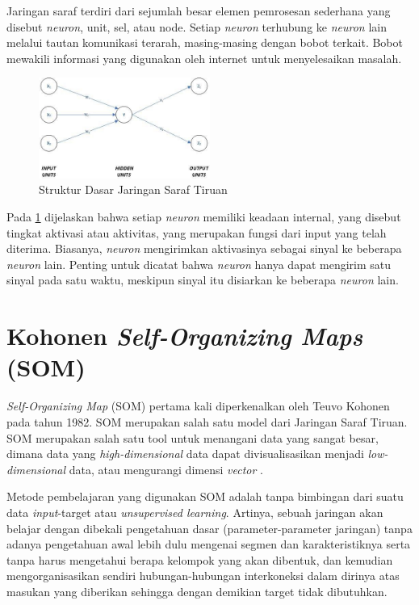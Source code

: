 Jaringan saraf terdiri dari sejumlah besar elemen pemrosesan sederhana yang disebut \textit{neuron}, unit, sel, atau node. Setiap \textit{neuron} terhubung ke \textit{neuron} lain melalui tautan komunikasi terarah, masing-masing dengan bobot terkait. Bobot mewakili informasi yang digunakan oleh internet untuk menyelesaikan masalah.

\begin{figure}[h]
	\centering
	\includegraphics[width=0.5\textwidth]{Gambar/strukturdata}
	\caption{Struktur Dasar Jaringan Saraf Tiruan}
	\label{fig:g2}
\end{figure}

Pada \ref{fig:g2} dijelaskan bahwa setiap \textit{neuron} memiliki keadaan internal, yang disebut tingkat aktivasi atau aktivitas, yang merupakan fungsi dari input yang telah diterima. Biasanya, \textit{neuron} mengirimkan aktivasinya sebagai sinyal ke beberapa \textit{neuron} lain. Penting untuk dicatat bahwa \textit{neuron} hanya dapat mengirim satu sinyal pada satu waktu, meskipun sinyal itu disiarkan ke beberapa \textit{neuron} lain.

\section{Kohonen \textit{Self-Organizing Maps} (SOM)}

\textit{Self-Organizing Map} (SOM) pertama kali diperkenalkan oleh Teuvo Kohonen pada tahun 1982. SOM merupakan salah satu model dari Jaringan Saraf Tiruan. SOM merupakan salah satu tool untuk menangani data yang sangat besar, 
dimana data yang \textit{high-dimensional} data dapat divisualisasikan menjadi \textit{low-dimensional} data, atau mengurangi dimensi \textit{vector} \citep{Kohonen2013}.

Metode pembelajaran yang digunakan SOM adalah tanpa bimbingan dari suatu data \textit{input}-target atau \textit{unsupervised learning}. Artinya, sebuah jaringan akan belajar dengan dibekali pengetahuan dasar (parameter-parameter jaringan) tanpa adanya pengetahuan awal lebih dulu mengenai segmen dan karakteristiknya serta tanpa harus mengetahui berapa kelompok yang akan dibentuk, dan kemudian mengorganisasikan sendiri hubungan-hubungan interkoneksi dalam dirinya atas masukan yang diberikan sehingga dengan demikian target tidak dibutuhkan.

